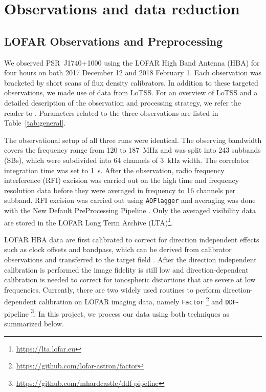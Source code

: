 \documentclass[manuscript]{aastex63}
\begin{document}
\section{Observations and data reduction}\label{sec:obs_reduction}

\subsection{LOFAR Observations and Preprocessing}\label{subsec:obs_general}

We observed PSR~J1740+1000 using the LOFAR High Band Antenna (HBA) for four hours on both 2017 December 12 and 2018 February 1. Each observation was bracketed by short scans of flux density calibrators. In addition to these targeted observations, we made use of data from LoTSS. For an overview of LoTSS and a detailed description of the observation and processing strategy, we refer the reader to \cite{2017Shimwell}. Parameters related to the three observations are listed in Table~\ref{tab:general}.

The observational setup of all three runs were identical. The observing bandwidth covers the frequency range from 120 to 187~MHz and was split into 243 subbands (SBs), which were subdivided into 64 channels of 3~kHz width. The correlator integration time was set to 1~s. After the observation, radio frequency interference (RFI) excision was carried out on the high time and frequency resolution data before they were averaged in frequency to 16 channels per subband. RFI excision was carried out using \texttt{AOFlagger} \citep{offringa2010,offringa2012} and averaging was done with the New Default PreProcessing Pipeline \citep[\texttt{NDPPP}][]{vandiepen2018}. Only the averaged visibility data are stored in the LOFAR Long Term Archive (LTA)\footnote{\url{https://lta.lofar.eu}}.

LOFAR HBA data are first calibrated to correct for direction independent effects such as clock offsets and bandpass, which can be derived from calibrator observations and transferred to the target field \citep[see, e.g.][]{2019DeGasperin}. After the direction independent calibration is performed the image fidelity is still low and direction-dependent calibration is needed to correct for ionospheric distortions that are severe at low frequencies. Currently, there are two widely used routines to perform direction-dependent calibration on LOFAR imaging data, namely \texttt{Factor} \citep{2016vanWeeren}\footnote{\url{https://github.com/lofar-astron/factor}} and \texttt{DDF}-pipeline \citep{2019Shimwell}\footnote{\url{https://github.com/mhardcastle/ddf-pipeline}}. In this project, we process our data using both techniques as summarized below.
\end{document}
